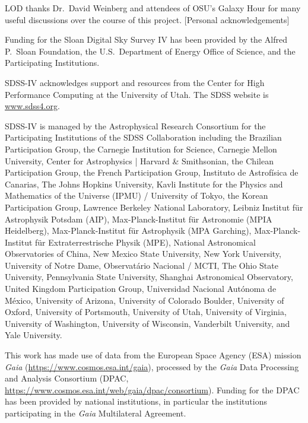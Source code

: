 \documentclass[twocolumn,twocolappendix,linenumbers,trackchanges]{aastex631}
\begin{document}
\begin{acknowledgments}
    LOD thanks Dr.\ David Weinberg and attendees of OSU's Galaxy Hour for many useful discussions over the course of this project.
    [Personal acknowledgements]
    
    Funding for the Sloan Digital Sky 
    Survey IV has been provided by the 
    Alfred P.\ Sloan Foundation, the U.S.\ 
    Department of Energy Office of 
    Science, and the Participating 
    Institutions. 
    
    SDSS-IV acknowledges support and 
    resources from the Center for High 
    Performance Computing  at the 
    University of Utah. The SDSS 
    website is \url{www.sdss4.org}.
    
    SDSS-IV is managed by the 
    Astrophysical Research Consortium 
    for the Participating Institutions 
    of the SDSS Collaboration including 
    the Brazilian Participation Group, 
    the Carnegie Institution for Science, 
    Carnegie Mellon University, Center for 
    Astrophysics | Harvard \& 
    Smithsonian, the Chilean Participation 
    Group, the French Participation Group, 
    Instituto de Astrof\'isica de 
    Canarias, The Johns Hopkins 
    University, Kavli Institute for the 
    Physics and Mathematics of the 
    Universe (IPMU) / University of 
    Tokyo, the Korean Participation Group, 
    Lawrence Berkeley National Laboratory, 
    Leibniz Institut f\"ur Astrophysik 
    Potsdam (AIP),  Max-Planck-Institut 
    f\"ur Astronomie (MPIA Heidelberg), 
    Max-Planck-Institut f\"ur 
    Astrophysik (MPA Garching), 
    Max-Planck-Institut f\"ur 
    Extraterrestrische Physik (MPE), 
    National Astronomical Observatories of 
    China, New Mexico State University, 
    New York University, University of 
    Notre Dame, Observat\'ario 
    Nacional / MCTI, The Ohio State 
    University, Pennsylvania State 
    University, Shanghai 
    Astronomical Observatory, United 
    Kingdom Participation Group, 
    Universidad Nacional Aut\'onoma 
    de M\'exico, University of Arizona, 
    University of Colorado Boulder, 
    University of Oxford, University of 
    Portsmouth, University of Utah, 
    University of Virginia, University 
    of Washington, University of 
    Wisconsin, Vanderbilt University, 
    and Yale University.
    
    This work has made use of data from the European Space Agency (ESA) mission
    {\it Gaia} (\url{https://www.cosmos.esa.int/gaia}), processed by the {\it Gaia}
    Data Processing and Analysis Consortium (DPAC,
    \url{https://www.cosmos.esa.int/web/gaia/dpac/consortium}). Funding for the DPAC
    has been provided by national institutions, in particular the institutions
    participating in the {\it Gaia} Multilateral Agreement.


\end{acknowledgments}
\end{document}
